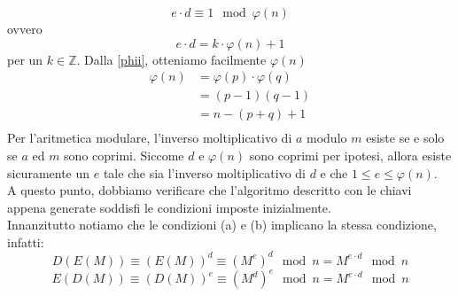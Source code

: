 \documentclass[italian,A4,12pt]{article}
\begin{document}
      $$e\cdot d \equiv 1 \mod{\varphi(n)}$$
      ovvero
      $$e\cdot d = k\cdot \varphi(n) +1$$
      per un $k\in\mathbb{Z}$.
      Dalla \eqref{phii}, otteniamo facilmente $\varphi(n)$
      \begin{align*}
        \varphi(n) &= \varphi(p)\cdot\varphi(q)\\
        &= (p-1)(q-1)\\
        &= n-(p+q)+1\\
      \end{align*}
      Per l'aritmetica modulare, l'inverso moltiplicativo di $a$ modulo $m$ esiste se e solo se $a$ ed $m$ sono coprimi. Siccome $d$ e $\varphi(n)$ sono coprimi per ipotesi, allora esiste sicuramente un $e$ tale che sia l'inverso moltiplicativo di $d$ e che $1\leq e \leq \varphi(n)$.\\
      A questo punto, dobbiamo verificare che l'algoritmo descritto con le chiavi appena generate soddisfi le condizioni imposte inizialmente.\\
      Innanzitutto notiamo che le condizioni (a) e (b) implicano la stessa condizione, infatti:
      \begin{equation}
        D(E(M))\equiv (E(M))^d\equiv (M^e)^d \mod{n}=M^{e\cdot d} \mod{n} \label{finale}
      \end{equation}
      $$E(D(M))\equiv (D(M))^e\equiv (M^d)^e \mod{n}=M^{e\cdot d} \mod{n}$$
\end{document}
